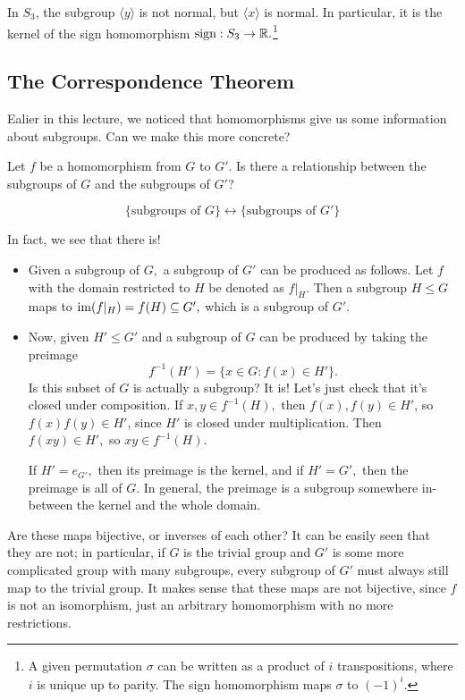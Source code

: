 \begin{example}
In $S_3$, the subgroup $\langle y \rangle $ is not normal, but $\langle x \rangle$ is normal. In particular, it is the kernel of the sign homomorphism $\text{sign}: S_3 \rightarrow \mathbb R.$\footnote{A given permutation $\sigma$ can be written as a product of $i$ transpositions, where $i$ is unique up to parity. The sign homomorphism maps $\sigma$ to $(-1)^i.$} 
\end{example}

\subsection{The Correspondence Theorem}
Ealier in this lecture, we noticed that homomorphisms give us some information about subgroups. Can we make this more concrete?
\begin{qq}
Let $f$ be a homomorphism from $G$ to $G'$. Is there a relationship between the subgroups of $G$ and the subgroups of $G'$?

\[
\{\text{subgroups of $G$}\} \leftrightarrow \{\text{subgroups of $G'$}\}
\]
\end{qq}
\begin{ans}
In fact, we see that there is!
\begin{itemize}
    \item Given a subgroup of $G,$ a subgroup of $G'$ can be produced as follows. Let $f$ with the domain restricted to $H$ be denoted as $f|_H.$  Then a subgroup $H \leq G$ maps to $\operatorname{im}(f|_H) = f(H) \subseteq G',$ which is a subgroup of $G'.$
    
    \item Now, given $H' \leq G'$ and a subgroup of $G$ can be produced by taking the preimage 
    \[
    f^{-1}(H') = \{x \in G : f(x) \in H'\}.
    \]
    Is this subset of $G$ is actually a subgroup? It is! Let's just check that it's closed under composition. If $x, y \in f^{-1}(H),$ then $f(x), f(y) \in H'$, so $f(x)f(y) \in H'$, since $H'$ is closed under multiplication. Then $f(xy) \in H',$ so $xy \in f^{-1}(H).$ 
    
    If $H' = e_{G'},$ then its preimage is the kernel, and if $H' = G',$ then the preimage is all of $G.$ In general, the preimage is a subgroup somewhere in-between the kernel and the whole domain.
\end{itemize}
\end{ans}


Are these maps bijective, or inverses of each other? It can be easily seen that they are not; in particular, if $G$ is the trivial group and $G'$ is some more complicated group with many subgroups, every subgroup of $G'$ must always still map to the trivial group. It makes sense that these maps are not bijective, since $f$ is not an isomorphism, just an arbitrary homomorphism with no more restrictions. 

